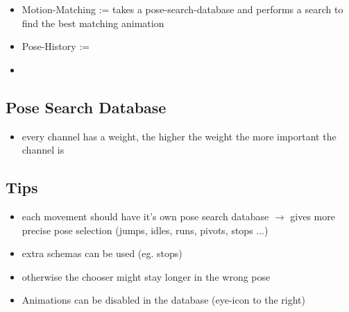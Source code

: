             \begin{itemize}
                \item Motion-Matching := takes a pose-search-database and performs a search to find the best matching animation
                \item Pose-History := 
                \item 
            \end{itemize}

        \subsection{Pose Search Database}
            \begin{itemize}
                \item every channel has a weight, the higher the weight the more important the channel is
            \end{itemize}
        


        \subsection{Tips}
            \begin{itemize}
                \item each movement should have it's own pose search database $\rightarrow$ gives more precise pose selection (jumps, idles, runs, pivots, stops ...)
                \item extra schemas can be used (eg. stops)
                \item otherwise the chooser might stay longer in the wrong pose
                \item Animations can be disabled in the database (eye-icon to the right)
            \end{itemize}


